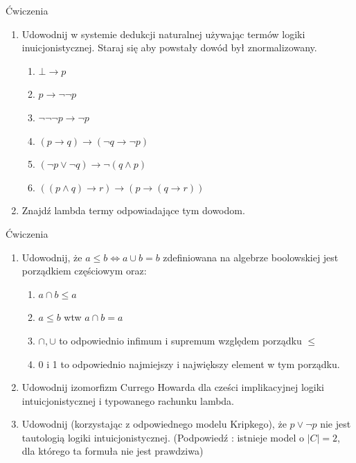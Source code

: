 \documentclass{beamer}
\begin{document}
\begin{frame}{Ćwiczenia}
\begin{enumerate}

	\item Udowodnij w systemie dedukcji naturalnej używając termów logiki inuicjonistycznej. Staraj się aby powstały dowód był znormalizowany.
	\begin{enumerate}
 \item \( \bot \rightarrow p\)
 \item \( p \rightarrow \neg \neg p \)
 \item \( \neg \neg \neg p \rightarrow \neg p\)
 \item \( (p \rightarrow q) \rightarrow (\neg q \rightarrow \neg p ) \)
 \item \( (\neg p \vee \neg q) \rightarrow \neg ( q \wedge p ) \)
 \item \( (( p \wedge q) \rightarrow r) \rightarrow ( p \rightarrow ( q \rightarrow r )) \)
\end{enumerate}
	\item Znajdź lambda termy odpowiadające tym dowodom. 
	\end{enumerate}
\end{frame}


\begin{frame}{Ćwiczenia}
\begin{enumerate}
	\item Udowodnij,  że \( a \leq b \Leftrightarrow a \cup b = b\) zdefiniowana na algebrze boolowskiej jest porządkiem częściowym oraz: 
	\begin{enumerate}
	\item \( a \cap b  \leq a\)
	\item \( a \leq b\) wtw \( a \cap b = a\)
	\item \( \cap , \cup\) to odpowiednio infimum i supremum względem porządku \( \leq\) 
	\item  0 i 1 to odpowiednio najmiejszy i największy element w tym porządku.
	\end{enumerate}
	\item Udowodnij izomorfizm Currego Howarda dla cześci implikacyjnej logiki intuicjonistycznej i typowanego rachunku lambda.
	\item Udowodnij (korzystając z odpowiednego modelu Kripkego), że \( p \vee \neg p \) nie jest tautologią logiki intuicjonistycznej. (Podpowiedź : istnieje model o \( |C| = 2\), dla którego ta formuła nie jest prawdziwa)
\end{enumerate}


\end{frame}
\end{document}
